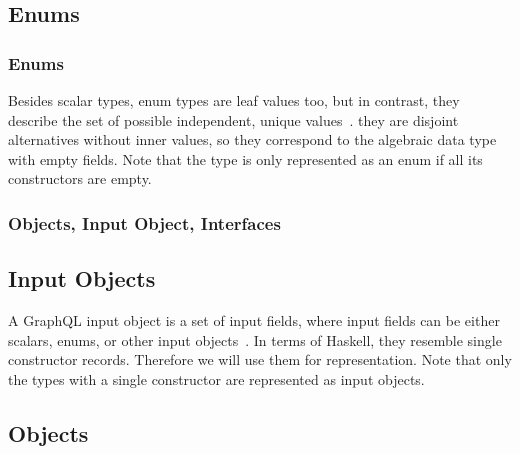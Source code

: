 \subsection{Enums}

\begin{frame}\frametitle{Enums}

Besides scalar types, enum types are leaf values too, but in contrast, they describe the set of possible independent, unique values~\cite{gql-spec}. they are disjoint alternatives without inner values, so they correspond to the algebraic data type with empty fields. Note that the type is only represented as an enum if all its constructors are empty.


\end{frame}

\begin{frame}\frametitle{Objects, Input Object, Interfaces}

\subsection{Input Objects}

A GraphQL input object is a set of input fields, 
where input fields can be either 
scalars, enums, or other input objects~\cite{gql-spec}. 
In terms of Haskell, they resemble single constructor records. 
Therefore we will use them for representation.  Note that only the types with a single constructor are represented as input objects.


\subsection{Objects}

\end{frame}

